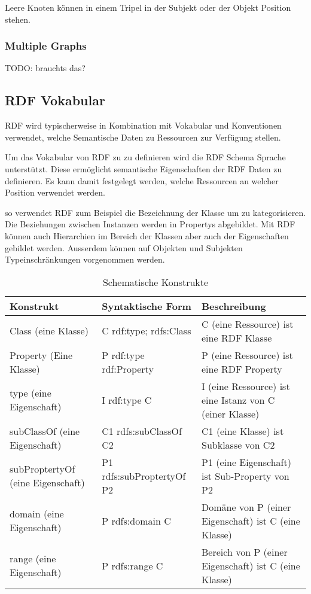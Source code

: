 \noindent\hspace*{15mm} Leere Knoten können in einem Tripel in der Subjekt oder der Objekt Position stehen.


\subsubsection{Multiple Graphs}
\label{sec:owlRdf_rdf_dataModel_multipleGraphs}

TODO: brauchts das?

\subsection{RDF Vokabular}
\label{sec:owlRdf_rdf_voca}
RDF wird typischerweise in Kombination mit Vokabular und Konventionen verwendet, welche Semantische Daten zu Ressourcen zur Verfügung stellen.

Um das Vokabular von RDF zu zu definieren wird die RDF Schema Sprache unterstützt. Diese ermöglicht semantische Eigenschaften der RDF Daten zu definieren. Es kann damit festgelegt werden, welche Ressourcen an welcher Position verwendet werden.

so verwendet RDF zum Beispiel die Bezeichnung der Klasse um zu kategorisieren. Die Beziehungen zwischen Instanzen werden in Propertys abgebildet. Mit RDF können auch Hierarchien im Bereich der Klassen aber auch der Eigenschaften gebildet werden. Ausserdem können auf Objekten und Subjekten Typeinschränkungen vorgenommen werden.

\begin{center}
	\begin{table}[H]
	 \centering
		\caption{Schematische Konstrukte}	
			\begin{tabular}{|l|l|l|} \toprule
			\textbf{Konstrukt}  & \textbf{Syntaktische Form} & \textbf{Beschreibung} \\ \midrule
				Class (eine Klasse) & C rdf:type; rdfs:Class& C (eine Ressource) ist eine RDF Klasse \\  \midrule		
				Property (Eine Klasse) & P rdf:type rdf:Property & P (eine Ressource) ist eine RDF Property\\  \midrule		
				type (eine Eigenschaft) & I rdf:type C &I (eine Ressource) ist eine Istanz von C (einer Klasse)\\  \midrule
subClassOf (eine Eigenschaft) & C1 rdfs:subClassOf C2 & C1 (eine Klasse) ist Subklasse von C2 \\  \midrule
subProptertyOf (eine Eigenschaft) & P1 rdfs:subProptertyOf P2 & P1 (eine Eigenschaft) ist Sub-Property von P2 \\  \midrule
domain (eine Eigenschaft) & P rdfs:domain C & Domäne von P (einer Eigenschaft) ist C (eine Klasse) \\  \midrule			
range (eine Eigenschaft) & P rdfs:range C & Bereich von P (einer Eigenschaft) ist C (eine Klasse) \\  \bottomrule
			\end{tabular}
		\label{tab:SchematischeKonstrukte}
	\end{table}
\end{center}

